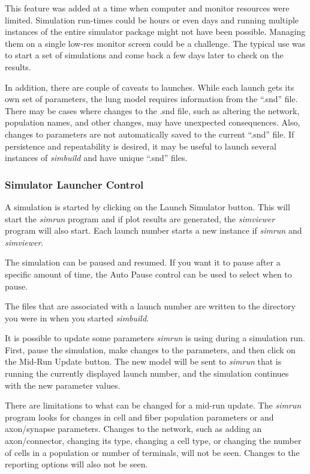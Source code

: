 \documentclass[12pt,openany,oneside]{book}
\newcommand{\prog}[1]{\textit{{#1}}}
\newcommand{\ext}[1]{{{``.#1''}}}
\begin{document}
This feature was added at a time when computer and monitor resources were
limited. Simulation run-times could be hours or even days and running
multiple instances of the entire simulator package might not have been
possible. Managing them on a single low-res monitor screen could be a
challenge. The typical use was to start a set of simulations and come back
a few days later to check on the results.

In addition, there are couple of caveats to
launches. While each launch gets its own set
of parameters, the lung model requires information from the \ext{snd}
file. There may be cases where changes to the .snd file, such as altering
the network, population names, and other changes, may have unexpected
consequences. Also, changes to parameters are not automatically saved to
the current \ext{snd} file. If persistence and repeatability is desired,
it may be useful to launch several instances of \prog{simbuild} and have
unique \ext{snd} files. 


\subsubsection{Simulator Launcher Control}

A simulation is started by clicking on the Launch Simulator button.
This will start the \prog{simrun} program and if plot results are
generated, the \prog{simviewer} program will also start.
Each launch number starts a new instance if \prog{simrun} and 
\prog{simviewer}.

The simulation can be paused and resumed. If you want it to pause after
a specific amount of time, the Auto Pause control can be used to select
when to pause.

The files that are associated with a launch number are written to the
directory you were in when you started \prog{simbuild}.

It is possible to update some parameters \prog{simrun} is using during a
simulation run. First, pause the simulation, make changes to the
parameters, and then click on the Mid-Run Update button. The new model
will be sent to \prog{simrun} that is running the currently displayed
launch number, and the simulation continues with the new parameter values.

There are limitations to what can be
changed for a mid-run update. The \prog{simrun} program looks for changes
in cell and fiber population parameters or and axon/synapse parameters.
Changes to the network, such as adding an axon/connector, changing its
type, changing a cell type, or changing the number of cells in a
population or number of terminals, will not be seen. Changes to the
reporting options will also not be seen.
\end{document}
